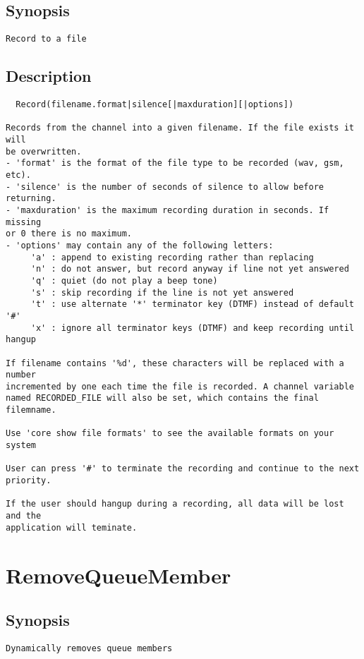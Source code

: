 \subsection{Synopsis}
\begin{verbatim}
Record to a file
\end{verbatim}
\subsection{Description}
\begin{verbatim}
  Record(filename.format|silence[|maxduration][|options])

Records from the channel into a given filename. If the file exists it will
be overwritten.
- 'format' is the format of the file type to be recorded (wav, gsm, etc).
- 'silence' is the number of seconds of silence to allow before returning.
- 'maxduration' is the maximum recording duration in seconds. If missing
or 0 there is no maximum.
- 'options' may contain any of the following letters:
     'a' : append to existing recording rather than replacing
     'n' : do not answer, but record anyway if line not yet answered
     'q' : quiet (do not play a beep tone)
     's' : skip recording if the line is not yet answered
     't' : use alternate '*' terminator key (DTMF) instead of default '#'
     'x' : ignore all terminator keys (DTMF) and keep recording until hangup

If filename contains '%d', these characters will be replaced with a number
incremented by one each time the file is recorded. A channel variable
named RECORDED_FILE will also be set, which contains the final filemname.

Use 'core show file formats' to see the available formats on your system

User can press '#' to terminate the recording and continue to the next priority.

If the user should hangup during a recording, all data will be lost and the
application will teminate. 

\end{verbatim}


\section{RemoveQueueMember}
\subsection{Synopsis}
\begin{verbatim}
Dynamically removes queue members
\end{verbatim}
